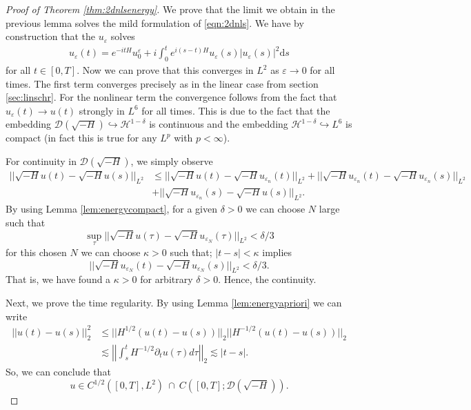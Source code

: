 \documentclass[11pt, oneside]{article}   	%
\newcommand{\ED}{\mathscr{D} ( \sqrt{-H})}
\newcommand{\ssp}{\mathscr{H}}
\begin{document}
\begin{proof}[Proof of Theorem \ref{thm:2dnlsenergy}]
	We prove that the limit we obtain in the previous lemma solves the mild formulation of \eqref{eqn:2dnls}. We have by construction that the $u_\varepsilon$ solves
	\begin{align*}
	u_\varepsilon(t)=e^{-itH}u^\varepsilon_0+i\int_{0}^{t}e^{i(s-t)H}u_\varepsilon(s)|u_\varepsilon(s)|^2\mathrm{d}s
	\end{align*}
	for all $t\in[0,T].$ Now we can prove that this converges in $L^2$ as $\varepsilon\to0$ for all times. The first term converges precisely as in the linear case from section \ref{sec:linschr}. For the nonlinear term the convergence follows from the fact that $u_\varepsilon(t)\to u(t)$ strongly in $L^6$ for all times. This is due to the fact that the embedding $\ED\hookrightarrow \ssp^{1-\delta}$ is continuous and the embedding $\ssp^{1-\delta}\hookrightarrow L^6$ is compact (in fact this is true for any $L^p$ with $p<\infty$).

	
	For continuity in $\mathscr{D}(\sqrt{-H})$, we simply observe 
	\begin{align*}
	||\sqrt{-H} u(t) - \sqrt{-H}u(s)||_{L^2} &\leq ||\sqrt{-H} u(t) - \sqrt{-H}u_{\varepsilon_n}(t)||_{L^2} + ||\sqrt{-H} u_{\varepsilon_n}(t) - \sqrt{-H}u_{\varepsilon_n}(s)||_{L^2} \\
	&+||\sqrt{-H} u_{\varepsilon_n}(s) - \sqrt{-H}u(s)||_{L^2}.
	\end{align*}
 By using Lemma \ref{lem:energycompact}, for a given $\delta >0$ we can  choose $N$ large such that
 \[
 \sup_{\tau} ||\sqrt{-H} u(\tau) - \sqrt{-H}u_{\varepsilon_N}(\tau)||_{L^2} < \delta/3
 \]
 for this chosen $N$ we can choose $\kappa >0$ such that; $|t-s|< \kappa$ implies
 \[
 ||\sqrt{-H} u_{\varepsilon_N}(t) - \sqrt{-H}u_{\varepsilon_N}(s)||_{L^2} < \delta/3.
 \]
 That is, we have found a $\kappa>0$ for arbitrary $\delta>0$.  Hence, the continuity. 
	
	Next, we prove the time regularity.
By using Lemma \ref{lem:energyapriori} we can write
\begin{align*}
||u(t) - u(s)||_2^2 &\leq ||H^{1/2}(u(t) - u(s)) ||_2 ||H^{-1/2}(u(t) - u(s)) ||_2\\ &\lesssim \left| \left|\int_s^t H^{-1/2} \partial_t u(\tau) d\tau \right|\right|_2 \lesssim |t-s|.
\end{align*} So, we can conclude that $$u \in C^{1 / 2} ([0, T], L^2)~\cap~ C([0,T]; \ED).$$
	

\end{proof}
\end{document}

